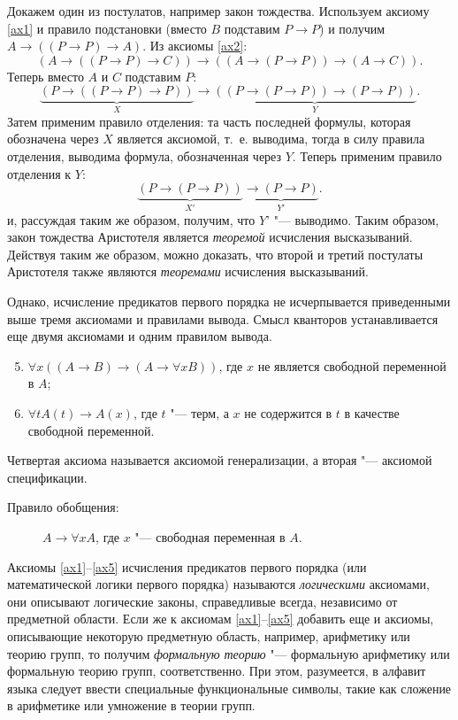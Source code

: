 \documentclass[b5paper,11pt]{book}
\begin{document}
	Докажем один из постулатов, например закон тождества. Используем  аксиому \ref{ax1} и правило подстановки (вместо $B$ подставим $P\rightarrow P$) и получим $A\rightarrow((P\rightarrow P)\rightarrow A)$. Из аксиомы \ref{ax2}:
	\[
		(A\rightarrow((P\rightarrow P)\rightarrow C))\rightarrow((A\rightarrow(P\rightarrow P))\rightarrow(A\rightarrow C)).
	\]
	Теперь вместо $A$ и $C$ подставим $P$:  
	\[
		\underbrace{(P\rightarrow((P\rightarrow P)\rightarrow P))}_{X}\rightarrow\underbrace{((P\rightarrow(P\rightarrow P))\rightarrow(P\rightarrow P))}_{Y}.
	\]
	Затем применим правило отделения: та часть последней формулы, которая обозначена через $X$ является аксиомой, т.~е. выводима, тогда в силу правила отделения, выводима формула, обозначенная через $Y$. Теперь применим правило отделения к $Y$: 
	\[
		\underbrace{(P\rightarrow(P\rightarrow P))}_{X'}\underbrace{\rightarrow(P\rightarrow P)}_{Y'}.
	\]
	и, рассуждая таким же образом, получим, что $Y’$ "--- выводимо. Таким образом, закон тождества Аристотеля является \textit{теоремой} исчисления высказываний. Действуя таким же образом, можно доказать, что второй и третий постулаты Аристотеля также являются \textit{теоремами} исчисления высказываний.
	
	Однако, исчисление предикатов первого порядка не исчерпывается приведенными выше тремя аксиомами и правилами вывода. Смысл кванторов устанавливается еще двумя аксиомами и одним правилом вывода.
	\begin{enumerate}
		\setcounter{enumi}{4}
		\item\label{ax4} $\forall x((A\rightarrow B)\rightarrow(A\rightarrow\forall x B))$, где $x$ не является свободной переменной в $A$;
		\item\label{ax5} $\forall t A(t)\rightarrow A(x)$, где $t$ "--- терм, а $x$ не содержится в $t$ в качестве свободной переменной.
	\end{enumerate}
	Четвертая аксиома называется аксиомой генерализации, а вторая "--- аксиомой спецификации.
	
	\begin{description}
		\item[Правило обобщения:] $A\rightarrow\forall xA$, где $x$ "--- свободная переменная в $A$.
	\end{description}

	Аксиомы \ref{ax1}--\ref{ax5} исчисления предикатов первого порядка (или математической логики первого порядка) называются \textit{логическими} аксиомами, они описывают логические законы, справедливые всегда, независимо от предметной области. Если же к аксиомам \ref{ax1}--\ref{ax5} добавить еще и аксиомы, описывающие некоторую предметную область, например, арифметику или теорию групп, то получим \textit{формальную теорию} "---  формальную арифметику или формальную теорию групп, соответственно. При этом, разумеется, в алфавит языка следует ввести специальные функциональные символы, такие как сложение в арифметике или умножение в теории групп.
	
\end{document}
